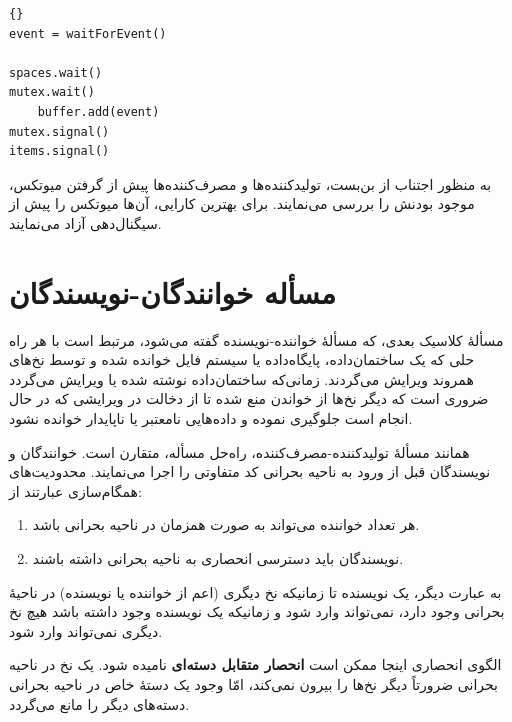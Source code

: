 \documentclass{book}
\begin{document}
\begin{latin}
\begin{lstlisting}[title=\rl{راه‌حل  بافر محدود تولیدکننده}]{}
event = waitForEvent()

spaces.wait()
mutex.wait()
    buffer.add(event)
mutex.signal()
items.signal()
\end{lstlisting}
\end{latin}

    به منظور اجتناب از بن‌بست، تولیدکننده‌ها و مصرف‌کننده‌ها پیش از گرفتن میوتکس، موجود بودنش را بررسی می‌نمایند. 
    برای بهترین کارایی، آن‌ها میوتکس را پیش از سیگنال‌دهی آزاد می‌نمایند. 


\section{مسأله خوانندگان-نویسندگان}

    مسألهٔ کلاسیک بعدی، که مسألهٔ خواننده-نویسنده گفته می‌شود، مرتبط است با هر راه حلی که یک ساختمان‌داده، پایگاه‌داده یا سیستم فایل 
    خوانده شده و توسط نخ‌های همروند ویرایش می‌گردند. زمانی‌که ساختمان‌داده نوشته شده یا ویرایش می‌گردد ضروری است که دیگر نخ‌ها
    از خواندن منع شده تا از دخالت در ویرایشی که در حال انجام است جلوگیری نموده و داده‌هایی نامعتبر یا ناپایدار خوانده نشود. 

    همانند مسألهٔ تولیدکننده‌-مصرف‌کننده،‌ راه‌حل مسأله، متقارن است. 
    خوانندگان و نویسندگان قبل از ورود به ناحیه بحرانی کد متفاوتی را اجرا می‌نمایند. محدودیت‌های همگام‌سازی عبارتند از: 

\begin{enumerate}

\item 
    هر تعداد خواننده می‌تواند به صورت همزمان در ناحیه بحرانی باشد. 

\item 
    نویسندگان باید دسترسی انحصاری به ناحیه بحرانی داشته باشند. 
\end{enumerate}

    به عبارت دیگر، یک نویسنده تا زمانیکه نخ دیگری (اعم از خواننده یا نویسنده) در ناحیهٔ بحرانی وجود دارد، نمی‌تواند وارد شود و زمانیکه یک نویسنده 
    وجود داشته باشد هیچ نخ دیگری نمی‌تواند وارد شود. 

    الگوی انحصاری اینجا ممکن است \textbf{انحصار متقابل دسته‌ای} نامیده شود. 
    یک نخ در ناحیه بحرانی ضرورتاً دیگر نخ‌ها را بیرون نمی‌کند، امّا وجود یک دستهٔ خاص در ناحیه بحرانی دسته‌های دیگر را مانع می‌گردد. 
\end{document}
